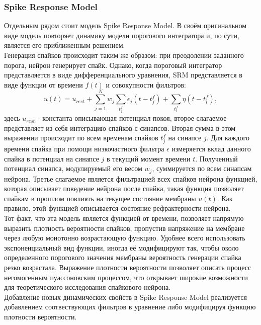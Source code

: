 \documentclass[a4paper,10pt]{article}
\begin{document}
\subsubsection{Spike Response Model}\label{sec:srm}
\indent Отдельным рядом стоит модель Spike Response Model. В своём оригинальном виде модель повторяет динамику модели порогового интегратора и, по сути, является его приближенным решением.\\ 
\indent Генерация спайков происходит таким же образом: при преодолении заданного порога, нейрон генерирует спайк. Однако, когда пороговый интегратор представляется в виде дифференциального уравнения, SRM представляется в виде функции от времени $f(t)$ и совокупности фильтров:
\begin{equation}\label{eq:srm}
u(t) = u_{rest} + \sum_{j=1}^N w_{j} \sum_{t^{f}_{j}} \epsilon_{j}(t-t^{f}_{j}) + \sum_{t^{f}_{i}}\eta(t-t^{f}_{i}),
\end{equation}
здесь $u_{rest}$ - константа описывающая потенциал покоя, второе слагаемое представляет из себя интеграцию спайков с синапсов. Вторая сумма в этом выражении происходит по всем временам спайков $t^{f}_{j}$ на синапсе $j$. Для каждого времени спайка при помощи низкочастного фильтра $\epsilon$ измеряется вклад данного спайка в потенциал на синапсе $j$ в текущий момент времени $t$. Полученный потенциал синапса, модулируемый его весом $w_{j}$, суммируется по всем синапсам нейрона. Третье слагаемое является фильтрацией всех спайков нейрона функцией, которая описывает поведение нейрона после спайка, такая функция позволяет спайкам в прошлом повлиять на текущее состояние мембраны $u(t)$. Как правило, этой функцией описывается состояние рефрактерности нейрона.\\
\indent Тот факт, что эта модель является функцией от времени, позволяет напрямую выразить плотность вероятности спайков, пропустив напряжение на мембране через любую монотонно возрастающую функцию. Удобнее всего использовать экспоненциальный вид функции, иногда её модифицируют так, чтобы около определенного порогового значения мембраны вероятность генерации спайка резко возрастала. Выражение плотности вероятности позволяет описать процесс негомогенным пуассоновским процессом, что открывает широкие возможности для теоретического исследования спайкового нейрона.\\
\indent Добавление новых динамических свойств в Spike Response Model реализуется добавлением соотвествующих фильтров в уравнение \cite{AdaptThesis} либо модифицируя функцию плотности вероятности\cite{TripleAdapt}. 
\end{document}
